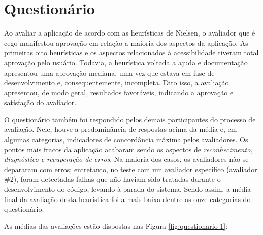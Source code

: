 \section{Questionário}

Ao avaliar a aplicação de acordo com as heurísticas de Nielsen, o avaliador que é cego manifestou aprovação em relação a maioria dos aspectos da aplicação.  As primeiras oito heurísticas e os aspectos relacionados à acessibilidade tiveram total aprovação pelo usuário. Todavia, a heurística voltada a ajuda e documentação apresentou uma aprovação mediana, uma vez que estava em fase de desenvolvimento e, consequentemente, incompleta. Dito isso, a avaliação apresentou, de modo geral, resultados favoráveis, indicando a aprovação e satisfação do avaliador.

O questionário também foi respondido pelos demais participantes do processo de avaliação. Nele, houve a predominância de respostas acima da média e, em algumas categorias, indicadores de concordância máxima pelos avaliadores. Os pontos mais fracos da aplicação acabaram sendo os aspectos de \emph{reconhecimento, diagnóstico e recuperação de erros}. Na maioria dos casos, os avaliadores não se depararam com erros; entretanto, no teste com um avaliador específico (avaliador \#2), foram detectadas falhas que não haviam sido tratadas durante o desenvolvimento do código, levando à parada do sistema. Sendo assim, a média final da avaliação desta heurística foi a mais baixa dentre as onze categorias do questionário.

As médias das avaliações estão dispostas nas Figura \ref{fig:questionario-1}:

